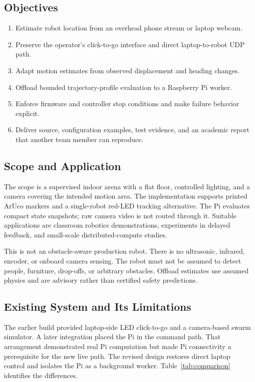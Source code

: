 \documentclass[11pt,a4paper]{article}
\begin{document}
\subsection{Objectives}
\begin{enumerate}
\item Estimate robot location from an overhead phone stream or laptop webcam.
\item Preserve the operator's click-to-go interface and direct laptop-to-robot UDP path.
\item Adapt motion estimates from observed displacement and heading changes.
\item Offload bounded trajectory-profile evaluation to a Raspberry Pi worker.
\item Enforce firmware and controller stop conditions and make failure behavior explicit.
\item Deliver source, configuration examples, test evidence, and an academic report
that another team member can reproduce.
\end{enumerate}

\subsection{Scope and Application}
The scope is a supervised indoor arena with a flat floor, controlled lighting,
and a camera covering the intended motion area. The implementation supports printed
ArUco markers and a single-robot red-LED tracking alternative. The Pi evaluates
compact state snapshots; raw camera video is not routed through it. Suitable
applications are classroom robotics demonstrations, experiments in delayed feedback,
and small-scale distributed-compute studies.

This is not an obstacle-aware production robot. There is no ultrasonic, infrared,
encoder, or onboard camera sensing. The robot must not be assumed to detect people,
furniture, drop-offs, or arbitrary obstacles. Offload estimates use assumed physics
and are advisory rather than certified safety predictions.

\subsection{Existing System and Its Limitations}
The earlier build provided laptop-side LED click-to-go and a camera-based swarm
simulator. A later integration placed the Pi in the command path. That arrangement
demonstrated real Pi computation but made Pi connectivity a prerequisite for the
new live path. The revised design restores direct laptop control and isolates the
Pi as a background worker. Table~\ref{tab:comparison} identifies the differences.
\end{document}
